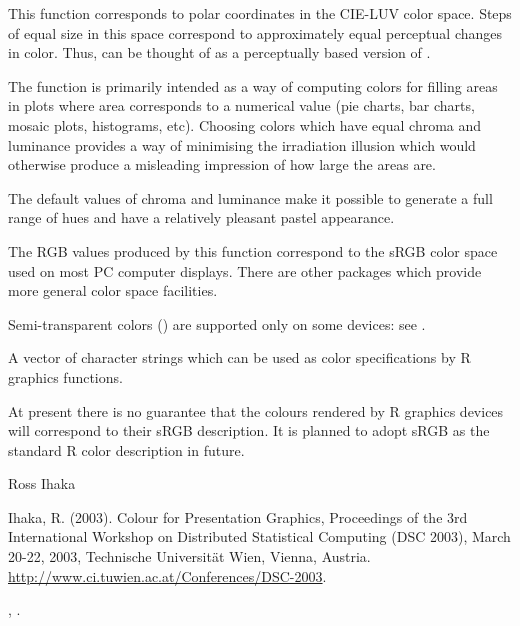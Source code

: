 \begin{Details}\relax
This function corresponds to polar coordinates in the CIE-LUV
color space. Steps of equal size in this space correspond to
approximately equal perceptual changes in color.  Thus, 
can be thought of as a perceptually based version of .

The function is primarily intended as a way of computing
colors for filling areas in plots where area corresponds to a
numerical value (pie charts, bar charts, mosaic plots, histograms,
etc).  Choosing colors which have equal chroma and luminance
provides a way of minimising the irradiation illusion which
would otherwise produce a misleading impression of how large
the areas are.

The default values of chroma and luminance make it possible
to generate a full range of hues and have a relatively pleasant
pastel appearance.

The RGB values produced by this function correspond to the sRGB
color space used on most PC computer displays.  There are other
packages which provide more general color space facilities.

Semi-transparent colors () are supported only on
some devices: see .
\end{Details}
%
\begin{Value}
A vector of character strings which can be used as color
specifications by R graphics functions.
\end{Value}
%
\begin{Note}\relax
At present there is no guarantee that the colours rendered by R
graphics devices will correspond to their sRGB description.
It is planned to adopt sRGB as the standard R color description
in future.
\end{Note}
%
\begin{Author}\relax
Ross Ihaka
\end{Author}
%
\begin{References}\relax
Ihaka, R. (2003).
Colour for Presentation Graphics, Proceedings of the 3rd International
Workshop on Distributed Statistical Computing (DSC 2003), March 20-22,
2003, Technische Universität Wien, Vienna, Austria.
\url{http://www.ci.tuwien.ac.at/Conferences/DSC-2003}.
\end{References}
%
\begin{SeeAlso}\relax
{},
.
\end{SeeAlso}
%
